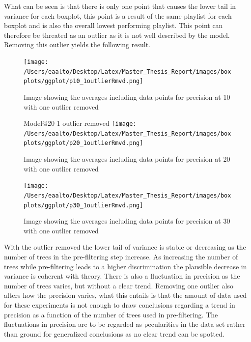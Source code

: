 \documentclass[a4paper,11pt]{kth-mag}
\begin{document}
What can be seen is that there is only one point that causes the lower tail in variance for each boxplot, this point is a result of the same playlist for each boxplot and is also the overall lowest performing playlist. This point can therefore be threated as an outlier as it is not well described by the model. Removing this outlier yields the following result.

\begin{figure}
\texttt{[image: /Users/eaalto/Desktop/Latex/Master\_Thesis\_Report/images/boxplots/ggplot/p10\_1outlierRmvd.png]}
\caption{Image showing the averages including data points for precision at 10 with one outlier removed}
\end{figure}

\begin{figure}
Model@20 1 outlier removed
\texttt{[image: /Users/eaalto/Desktop/Latex/Master\_Thesis\_Report/images/boxplots/ggplot/p20\_1outlierRmvd.png]}
\caption{Image showing the averages including data points for precision at 20 with one outlier removed}
\end{figure}

\begin{figure}
\texttt{[image: /Users/eaalto/Desktop/Latex/Master\_Thesis\_Report/images/boxplots/ggplot/p30\_1outlierRmvd.png]}
\caption{Image showing the averages including data points for precision at 30 with one outlier removed}
\end{figure}


With the outlier removed the lower tail of variance is stable or decreasing as the number of trees in the pre-filtering step increase. As increasing the number of trees while pre-filtering leads to a higher discrimination the plausible decrease in variance is coherent with theory. There is also a fluctuation in precision as the number of trees varies, but without a clear trend. Removing one outlier also alters how the precision varies, what this entails is that the amount of data used for these experiments is not enough to draw conclusions regarding a trend in precision as a function of the number of trees used in pre-filtering. The fluctuations in precision are to be regarded as pecularities in the data set rather than ground for generalized conclusions as no clear trend can be spotted.
\end{document}
